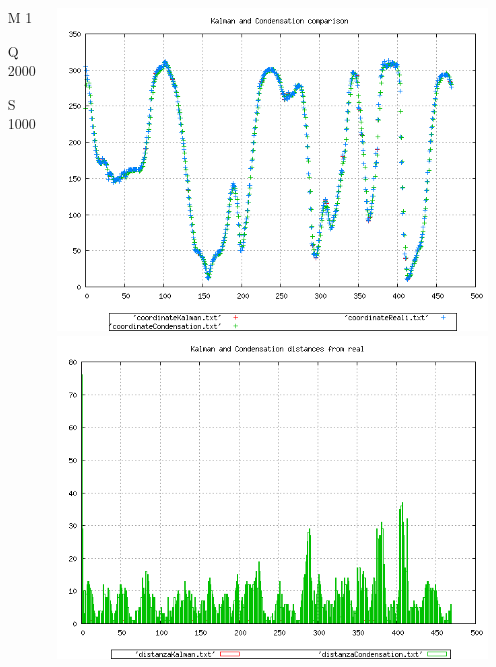 \documentclass{beamer}
\begin{document}
{\begin{columns}
\begin{scriptsize}
\begin{itemize}
\item [M]1
\item [Q]2000
\item [S]1000
\end{itemize}
\end{scriptsize}
\includegraphics[scale=0.1]{../esperimenti/tappeto_nozoom/mod_1-Q_2000-S_1000/plot.png}\\
\includegraphics[scale=0.1]{../esperimenti/tappeto_nozoom/mod_1-Q_2000-S_1000/plot-distances.png}
\end{columns}

}
\end{document}
